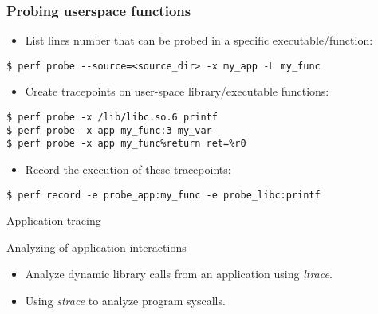 \begin{frame}[fragile]
  \frametitle{Probing userspace functions}
  \begin{itemize}
    \item List lines number that can be probed in a specific
          executable/function:
  \end{itemize}
  \begin{block}{}
    \begin{verbatim}
$ perf probe --source=<source_dir> -x my_app -L my_func
    \end{verbatim}
  \end{block}
  \begin{itemize}
    \item Create tracepoints on user-space library/executable functions:
  \end{itemize}
  \begin{block}{}
    \begin{verbatim}
$ perf probe -x /lib/libc.so.6 printf
$ perf probe -x app my_func:3 my_var
$ perf probe -x app my_func%return ret=%r0
    \end{verbatim}
  \end{block}
  \begin{itemize}
  \item Record the execution of these tracepoints:
  \end{itemize}
  \begin{block}{}
    \begin{verbatim}
$ perf record -e probe_app:my_func -e probe_libc:printf
    \end{verbatim}
  \end{block}
\end{frame}

\setuplabframe
{Application tracing}
{
  Analyzing of application interactions
  \begin{itemize}
    \item Analyze dynamic library calls from an application using
            {\em ltrace}.
    \item Using {\em strace} to analyze program syscalls.
  \end{itemize}
}
